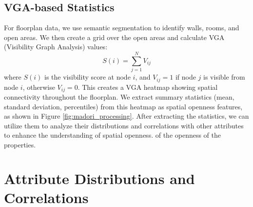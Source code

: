 \documentclass[11pt,a4paper]{article}
\begin{document}
\begin{multicols}{2}
\subsection{VGA-based Statistics}
For floorplan data, we use semantic segmentation to identify walls, rooms, and open areas. 
We then create a grid over the open areas and calculate VGA (Visibility Graph Analysis) values:
\begin{equation}
\label{eq:vga_definition}
S(i) = \sum_{j=1}^{N} V_{ij}
\end{equation}
where $S(i)$ is the visibility score at node $i$, and $V_{ij} = 1$ if node $j$ is visible from node $i$, otherwise $V_{ij} = 0$. 
This creates a VGA heatmap showing spatial connectivity throughout the floorplan. We extract summary statistics 
(mean, standard deviation, percentiles) from this heatmap as spatial openness features, as shown in Figure \ref{fig:madori_processing}.
After extracting the statistics, we can utilize them to analyze their distributions and correlations with other attributes to enhance the understanding of spatial openness.
of the openness of the properties.
\vspace{1em}

\section{Attribute Distributions and Correlations}


\end{multicols}
\end{document}
